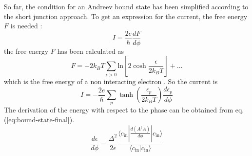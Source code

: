 So far, the condition for an Andreev bound state has been simplified according to the short junction approach. To get an expression for the current, the free energy $F$ is needed \cite{Beenakker1992}:
\begin{equation}
I = \frac{ 2 e}{\hbar} \frac{d F}{d \phi}
\end{equation}
the free energy $F$ has been calculated as \cite{Beenakker1991}
\begin{equation}
F = - 2 k_B T \sum_{\epsilon > 0 } \text{ln} \left[ 2 \cosh \frac{\epsilon}{2 k_B T}  \right] + \dots
\end{equation}
which is the free energy of a non interacting electron . 
So the current is
\begin{equation}
I = - \frac{2 e}{\hbar} \sum_p \tanh \left( \frac{\epsilon_p}{2 k_B T} \right) \frac{d \epsilon_p }{d \phi}
\end{equation}
The derivation of the energy with respect to the phase can be obtained from eq. (\ref{eq:bound-state-final}).
\begin{equation}
\frac{d \epsilon}{d \phi } = \frac{\Delta^2}{2 \epsilon} \frac{\langle c_\text{in} | \frac{d ( A^\dagger A )}{d \phi }| c_\text{in} \rangle} {\langle c_\text{in} |c_\text{in} \rangle}
\end{equation}

